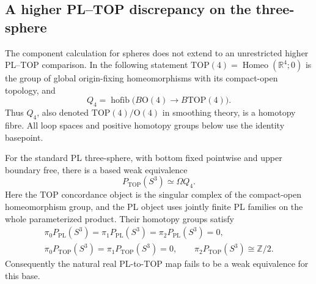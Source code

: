 \subsection{A higher PL--TOP discrepancy on the three-sphere}

The component calculation for spheres does not extend to an unrestricted
higher PL--TOP comparison.  In the following statement
$\mathrm{TOP}(4)=\operatorname{Homeo}(\mathbb R^4;0)$ is the group of
global origin-fixing homeomorphisms with its compact-open topology, and
\[
 Q_4=\operatorname{hofib}
       \bigl(B\mathrm O(4)\longrightarrow B\mathrm{TOP}(4)\bigr).
\]
Thus $Q_4$, also denoted $\mathrm{TOP}(4)/\mathrm O(4)$ in smoothing
theory, is a homotopy fibre.  All loop spaces and positive homotopy
groups below use the identity basepoint.

\begin{theorem}\label{thm:three-sphere-higher-top-discrepancy}
For the standard PL three-sphere, with bottom fixed pointwise and
upper boundary free, there is a based weak equivalence
\[
                  P_{\mathrm{TOP}}(S^3)\simeq\Omega Q_4.
\]
Here the TOP concordance object is the singular complex of the
compact-open homeomorphism group, and the PL object uses jointly
finite PL families on the whole parameterized product.  Their
homotopy groups satisfy
\[
 \begin{gathered}
 \pi_0P_{\mathrm{PL}}(S^3)=\pi_1P_{\mathrm{PL}}(S^3)
          =\pi_2P_{\mathrm{PL}}(S^3)=0,\\
 \pi_0P_{\mathrm{TOP}}(S^3)=\pi_1P_{\mathrm{TOP}}(S^3)=0,
 \qquad \pi_2P_{\mathrm{TOP}}(S^3)\cong\mathbb Z/2.
 \end{gathered}
\]
Consequently the natural real PL-to-TOP map fails to be a weak
equivalence for this base.
\end{theorem}

